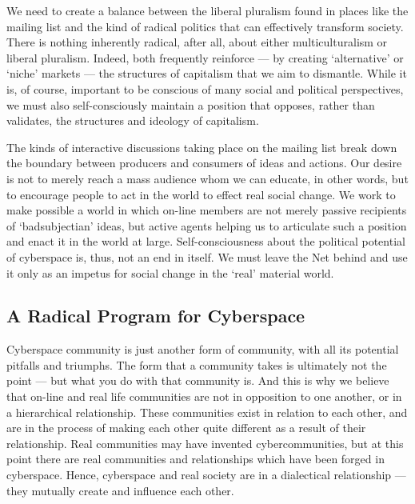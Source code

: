 \documentclass[letterpaper,12pt,english]{sphinxmanual}
\begin{document}
We need to create a balance between the liberal pluralism found in places like the mailing list and the kind of radical politics that can effectively transform society. There is nothing inherently radical, after all, about either multiculturalism or liberal pluralism. Indeed, both frequently reinforce — by creating `alternative' or `niche' markets — the structures of capitalism that we aim to dismantle. While it is, of course, important to be conscious of many social and political perspectives, we must also self-consciously maintain a position that opposes, rather than validates, the structures and ideology of capitalism.

The kinds of interactive discussions taking place on the mailing list break down the boundary between producers and consumers of ideas and actions. Our desire is not to merely reach a mass audience whom we can educate, in other words, but to encourage people to act in the world to effect real social change. We work to make possible a world in which on-line members are not merely passive recipients of `badsubjectian' ideas, but active agents helping us to articulate such a position and enact it in the world at large. Self-consciousness about the political potential of cyberspace is, thus, not an end in itself. We must leave the Net behind and use it only as an impetus for social change in the `real' material world.


\subsection{A Radical Program for Cyberspace}
\label{1995:a-radical-program-for-cyberspace}
Cyberspace community is just another form of community, with all its potential pitfalls and triumphs. The form that a community takes is ultimately not the point — but what you do with that community is. And this is why we believe that on-line and real life communities are not in opposition to one another, or in a hierarchical relationship. These communities exist in relation to each other, and are in the process of making each other quite different as a result of their relationship. Real communities may have invented cybercommunities, but at this point there are real communities and relationships which have been forged in cyberspace. Hence, cyberspace and real society are in a dialectical relationship — they mutually create and influence each other.
\end{document}
